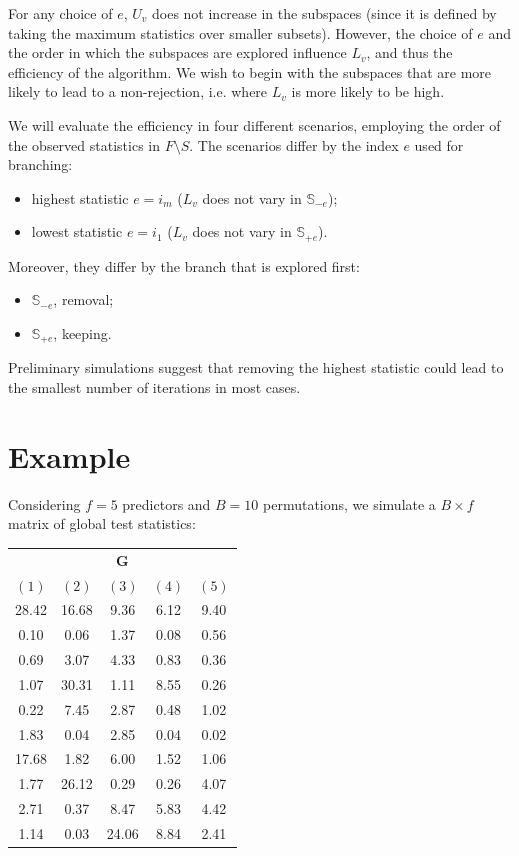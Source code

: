 \documentclass[11pt,a4paper,openright,twoside]{article}
\begin{document}
For any choice of $e$, $U_v$ does not increase in the subspaces (since it is defined by taking the maximum statistics over smaller subsets). However, the choice of $e$ and the order in which the subspaces are explored influence $L_v$, and thus the efficiency of the algorithm. We wish to begin with the subspaces that are more likely to lead to a non-rejection, i.e. where $L_v$ is more likely to be high.

We will evaluate the efficiency in four different scenarios, employing the order of the observed statistics in $F\setminus S$. The scenarios differ by the index $e$ used for branching:
\begin{itemize}
\item highest statistic $e=i_m$ ($L_v$ does not vary in $\mathbb{S}_{-e}$);
\item lowest statistic $e=i_1$ ($L_v$ does not vary in $\mathbb{S}_{+e}$).
\end{itemize}
Moreover, they differ by the branch that is explored first:
\begin{itemize}
\item $\mathbb{S}_{-e}$, removal;
\item $\mathbb{S}_{+e}$, keeping.
\end{itemize}
Preliminary simulations suggest that removing the highest statistic could lead to the smallest number of iterations in most cases.









\newpage

\section{Example}
Considering $f=5$ predictors and $B=10$ permutations, we simulate a $B\times f$ matrix of global test statistics:

\begin{table}[h!]
\centering
\begin{tabular}{ccccc}
\multicolumn{5}{c}{$\mathbf{G}$}\\
$(1)$ & $(2)$ & $(3)$ & $(4)$ & $(5)$\\
\cline{1-5}
28.42 & 16.68 & 9.36 & 6.12 & 9.40\\
0.10 & 0.06 & 1.37 & 0.08 & 0.56\\
0.69 & 3.07 & 4.33 & 0.83 & 0.36\\
1.07 & 30.31 & 1.11 & 8.55 & 0.26\\
0.22 & 7.45 & 2.87 & 0.48 & 1.02\\
1.83 & 0.04 & 2.85 & 0.04 & 0.02\\
17.68 & 1.82 & 6.00 & 1.52 & 1.06\\
1.77 & 26.12 & 0.29 & 0.26 & 4.07\\
2.71 & 0.37 & 8.47 & 5.83 & 4.42\\
1.14 & 0.03 & 24.06 & 8.84 & 2.41\\
\end{tabular}
\end{table}
\end{document}
